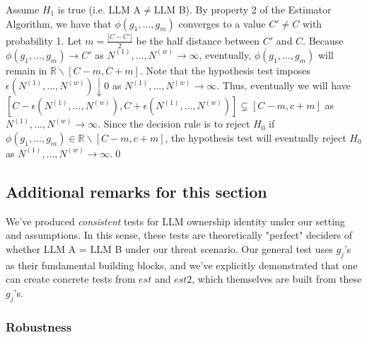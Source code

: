 \documentclass{article}
\begin{document}
Assume $\displaystyle H_{1}$ is true (i.e. LLM A$\displaystyle \neq $LLM B). By property 2 of the Estimator Algorithm, we have that $\displaystyle \phi \left( g_{1} ,...,g_{m}\right)$ converges to a value $\displaystyle C'\neq C$ with probability 1. Let $\displaystyle m=\frac{|C-C'|}{2}$ be the half distance between $\displaystyle C'$ and $\displaystyle C$. Because $\displaystyle \phi \left( g_{1} ,...,g_{m}\right)\rightarrow C'$ as $\displaystyle N^{\left( 1\right)} ,...,N^{\left( w\right)}\rightarrow \infty $, eventually, $\displaystyle \phi \left( g_{1} ,...,g_{m}\right)$ will remain in $\displaystyle \mathbb{R} \backslash \left[ C-m,C+m\right]$. Note that the hypothesis test imposes $\displaystyle \epsilon \left( N^{\left( 1\right)} ,...,N^{\left( w\right)}\right) \downarrow 0$ as $\displaystyle N^{\left( 1\right)} ,...,N^{\left( w\right)}\rightarrow \infty $. Thus, eventually we will have $\displaystyle \left[ C-\epsilon \left( N^{\left( 1\right)} ,...,N^{\left( w\right)}\right) ,C+\epsilon \left( N^{\left( 1\right)} ,...,N^{\left( w\right)}\right)\right] \varsubsetneq \left[ C-m,c+m\right]$ as $\displaystyle N^{\left( 1\right)} ,...,N^{\left( w\right)}\rightarrow \infty $. Since the decision rule is to reject $\displaystyle H_{0}$ if $\displaystyle \phi \left( g_{1} ,...,g_{m}\right) \in \mathbb{R} \backslash \left[ C-m,c+m\right]$, the hypothesis test will eventually reject $\displaystyle H_{0}$ as $\displaystyle N^{\left( 1\right)} ,...,N^{\left( w\right)}\rightarrow \infty $.\qed 



\subsection{Additional remarks for this section}

We've produced \textit{consistent} tests for LLM ownership identity under our setting and assumptions. In this sense, these tests are theoretically "perfect" deciders of whether LLM A = LLM B under our threat scenario. Our general test uses $\displaystyle g_{j}$'s as their fundamental building blocks, and we've explicitly demonstrated that one can create concrete tests from $\displaystyle est$ and $\displaystyle est2$, which themselves are built from these $\displaystyle g_{j}$'s.



\subsubsection{Robustness}
\end{document}
